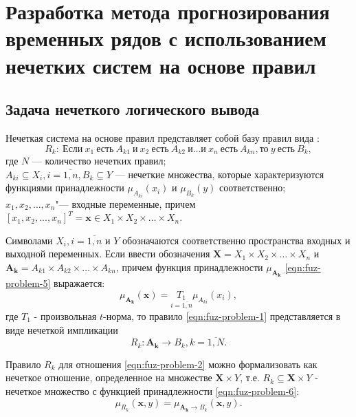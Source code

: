 \chapter{Разработка метода прогнозирования временных рядов с использованием нечетких систем на основе правил}\label{ch:ch2}

\section{Задача нечеткого логического вывода}\label{sec:ch2/fuzzy-inference-problem-statement}

Нечеткая система на основе правил представляет собой базу правил вида \cite{RyzhovFuzzySets, rutkovskiy2010, NazarovKony2026}:
\begin{equation}
	\label{eqn:fuz-problem-1}
	R_k:\ \text{Если}\ x_1\ \text{есть}\ A_{k1}\ \text{и}\ x_2\ \text{есть}\ A_{k2}\ \text{и} \dots \text{и}\ x_n\ \text{есть}\ A_{kn}, \text{то}\ y\ \text{есть}\ B_k,
\end{equation}
где $N$ --- количество нечетких правил;\\
${}$\quad\enspace$A_{ki} \subseteq X_i, i=\overline{1,n}, B_k \subseteq Y$ --- нечеткие множества, которые характеризуются функциями принадлежности $\mu_{A_{ki}}(x_i)$ и $\mu_{B_k}(y)$ соответственно;\\
${}$\quad\enspace$x_1, x_2,…,x_n$"--- входные переменные, причем $[x_1, x_2, ..., x_n]^T = \mathbf{x} \in X_1 \times X_2 \times \dots \times X_n$.

Символами  $X_i, i=\overline{1,n}$ и $Y$ обозначаются соответственно пространства входных и выходной переменных. Если ввести обозначения $\mathbf{X}=X_1 \times X_2 \times \dots \times X_n$ и $\mathbf{A_k}=A_{k1}\times A_{k2} \times \dots \times A_{kn}$, причем функция принадлежности $\mu_{\mathbf{A_k}}$ \eqref{eqn:fuz-problem-5} выражается:
\begin{equation}
	\label{eqn:fuz-problem-5}
	\mu_\mathbf{A_k}(\mathbf{x}) = \underset{i=\overline{1,n}}{T_1} \mu_{A_{ki}}(x_i),
\end{equation}
где $T_1$ - произвольная $t$-норма, то правило \ref{eqn:fuz-problem-1} представляется в виде нечеткой импликации
\begin{equation}
	\label{eqn:fuz-problem-2}
	R_k: \mathbf{A_k} \to B_k, k=\overline{1,N}.
\end{equation}

Правило $R_k$ для отношения \eqref{eqn:fuz-problem-2} можно формализовать как нечеткое отношение, определенное на множестве  $\mathbf{X}\times Y$, т.е. $R_k \subseteq \mathbf{X} \times Y$ - нечеткое множество с функцией принадлежности \eqref{eqn:fuz-problem-6}:
\begin{equation}
	\label{eqn:fuz-problem-6}
	\mu_{R_k}(\mathbf{x}, y) = \mu_{\mathbf{A_k} \to B_k} (\mathbf{x}, y).
\end{equation}

